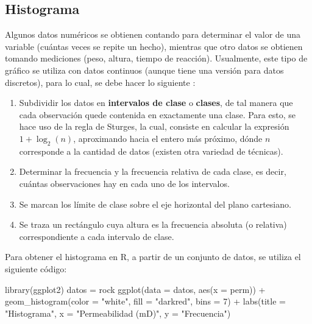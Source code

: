 \documentclass[
]{book}
\newenvironment{Shaded}{\begin{snugshade}}{\end{snugshade}}
\newcommand{\AttributeTok}[1]{\textcolor[rgb]{0.77,0.63,0.00}{#1}}
\newcommand{\DecValTok}[1]{\textcolor[rgb]{0.00,0.00,0.81}{#1}}
\newcommand{\FunctionTok}[1]{\textcolor[rgb]{0.00,0.00,0.00}{#1}}
\newcommand{\NormalTok}[1]{#1}
\newcommand{\OtherTok}[1]{\textcolor[rgb]{0.56,0.35,0.01}{#1}}
\newcommand{\SpecialCharTok}[1]{\textcolor[rgb]{0.00,0.00,0.00}{#1}}
\newcommand{\StringTok}[1]{\textcolor[rgb]{0.31,0.60,0.02}{#1}}
\providecommand{\tightlist}{%
  \setlength{\itemsep}{0pt}\setlength{\parskip}{0pt}}
\begin{document}
\hypertarget{histograma}{%
\subsection{Histograma}\label{histograma}}

Algunos datos numéricos se obtienen contando para determinar el valor de una variable (cuántas veces se repite un hecho), mientras que otro datos se obtienen tomando mediciones (peso, altura, tiempo de reacción). Usualmente, este tipo de gráfico se utiliza con datos continuos (aunque tiene una versión para datos discretos), para lo cual, se debe hacer lo siguiente \citep[paǵina 12]{Devore}:

\begin{enumerate}
\def\labelenumi{\arabic{enumi}.}
\tightlist
\item
  Subdividir los datos en \textbf{intervalos de clase} o \textbf{clases}, de tal manera que cada observación quede contenida en exactamente una clase. Para esto, se hace uso de la regla de Sturges, la cual, consiste en calcular la expresión \(1+\log_2(n)\), aproximando hacia el entero más próximo, dónde \(n\) corresponde a la cantidad de datos (existen otra variedad de técnicas).
\item
  Determinar la frecuencia y la frecuencia relativa de cada clase, es decir, cuántas observaciones hay en cada uno de los intervalos.
\item
  Se marcan los límite de clase sobre el eje horizontal del plano cartesiano.
\item
  Se traza un rectángulo cuya altura es la frecuencia absoluta (o relativa) correspondiente a cada intervalo de clase.
\end{enumerate}

Para obtener el histograma en R, a partir de un conjunto de datos, se utiliza el siguiente código:

\begin{Shaded}
\begin{Highlighting}[]
\FunctionTok{library}\NormalTok{(ggplot2)}
\NormalTok{datos }\OtherTok{=}\NormalTok{ rock}
\FunctionTok{ggplot}\NormalTok{(}\AttributeTok{data =}\NormalTok{ datos, }\FunctionTok{aes}\NormalTok{(}\AttributeTok{x =}\NormalTok{ perm)) }\SpecialCharTok{+}
  \FunctionTok{geom\_histogram}\NormalTok{(}\AttributeTok{color =} \StringTok{"white"}\NormalTok{, }\AttributeTok{fill =} \StringTok{"darkred"}\NormalTok{, }\AttributeTok{bins =} \DecValTok{7}\NormalTok{) }\SpecialCharTok{+}
  \FunctionTok{labs}\NormalTok{(}\AttributeTok{title =} \StringTok{"Histograma"}\NormalTok{, }\AttributeTok{x =} \StringTok{"Permeabilidad (mD)"}\NormalTok{, }\AttributeTok{y =} \StringTok{"Frecuencia"}\NormalTok{)}
\end{Highlighting}
\end{Shaded}
\end{document}
